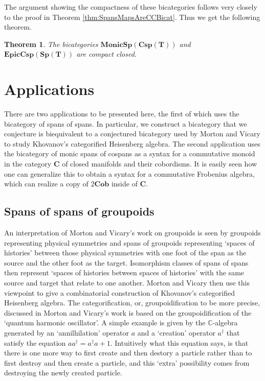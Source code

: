 \documentclass[11pt]{amsart}
\newcommand{\cat}[1]{\mathbf{#1}}
\newcommand{\bimonspcsp}[1]{\mathbf{MonicSp(Csp(#1))}}
\newcommand{\biepiccspsp}[1]{\mathbf{EpicCsp(Sp(#1))}}
\newtheorem{thm}{Theorem}[section]
\theoremstyle{remark}
\theoremstyle{definition}
\begin{document}
The argument showing the compactness of these bicategories follows very closely to the proof in Theorem \ref{thm:SpansMapsAreCCBicat}. Thus we get the following theorem.

\begin{thm}
	\label{thm:SpansCospansAreCCBicat}
	The bicategories $\bimonspcsp{T}$ and $\biepiccspsp{T}$ are compact closed.
\end{thm}

\section{Applications} %
\label{sec:Applications}

There are two applications to be presented here, the first of which uses the bicategory of spans of spans.  In particular, we construct a bicategory that we conjecture is biequivalent to a conjectured bicategory used by Morton and Vicary \cite{MortVic} to study Khovanov's categorified Heisenberg algebra.  The second application uses the bicategory of monic spans of cospans as a syntax for a commutative monoid in the category $\cat{C}$ of closed manifolds and their cobordisms. It is easily seen how one can generalize this to obtain a syntax for a commutative Frobenius algebra, which can realize a copy of $2\cat{Cob}$ inside of $\cat{C}$.   


\subsection{Spans of spans of groupoids} %
\label{subsec:SpanSpanGroupoid}


An interpretation of Morton and Vicary's \cite{MortVic} work on groupoids is seen by groupoids representing physical symmetries and spans of groupoids representing `spaces of histories' between those physical symmetries with one foot of the span as the source and the other foot as the target. Isomorphism classes of spans of spans then represent `spaces of histories between spaces of histories' with the same source and target that relate to one another. Morton and Vicary then use this viewpoint to give a combinatorial construction of Khovanov's categorified Heisenberg algebra. The categorification, or, groupoidification to be more precise, discussed in Morton and Vicary's work is based on the groupoidification of the `quantum harmonic oscillator'. A simple example is given by the $\mathbb{C}$-algebra generated by an `annilhilation' operator $a$ and a `creation' operator $a^\dagger$ that satisfy the equation $aa^\dagger=a^\dagger a+1$. Intuitively what this equation says, is that there is one more way to first create and then destory a particle rather than to first destroy and then create a particle, and this `extra' possibility comes from destroying the newly created particle.
\end{document}

